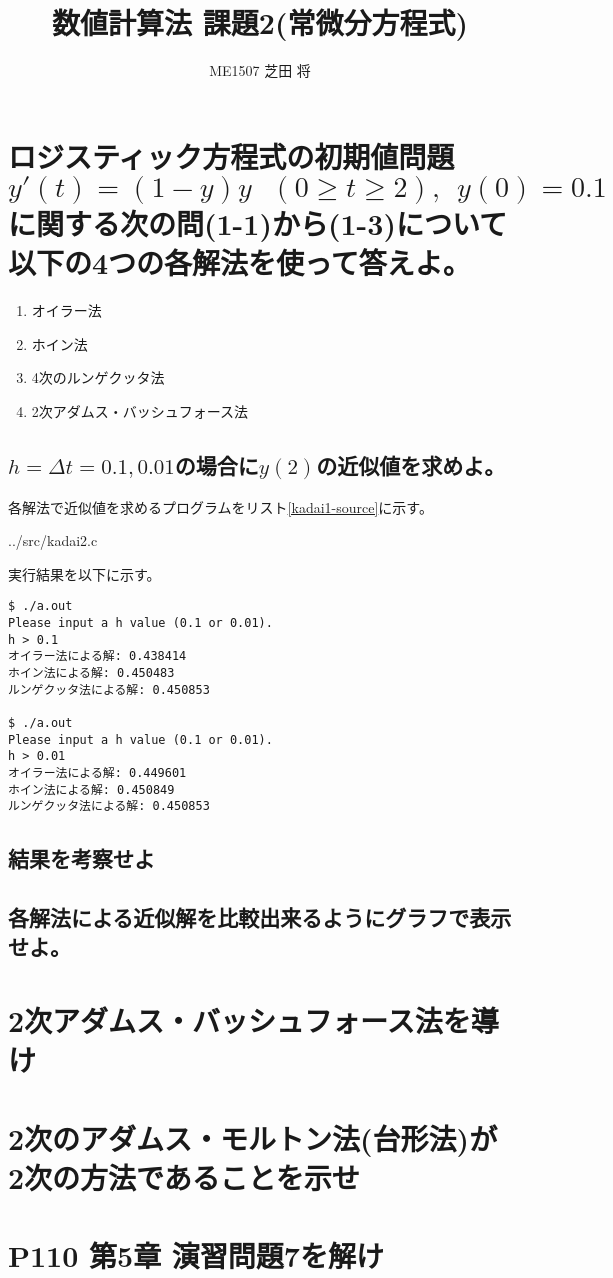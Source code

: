 \documentclass[]{jsarticle}
\title{\LARGE {数値計算法 課題2(常微分方程式)}}
\author{\large {ME1507 芝田 将}}
\begin{document}
\maketitle

\section{ロジスティック方程式の初期値問題$y'(t)=(1-y)y ~~~ (0 \ge t \ge 2),~~ y(0)=0.1$に関する次の問(1-1)から(1-3)について以下の4つの各解法を使って答えよ。}

\begin{enumerate}
\item オイラー法
\item ホイン法
\item 4次のルンゲクッタ法
\item 2次アダムス・バッシュフォース法
\end{enumerate}

\subsection{$h=\Delta t = 0.1, 0.01$の場合に$y(2)$の近似値を求めよ。}

各解法で近似値を求めるプログラムをリスト\ref{kadai1-source}に示す。


{../src/kadai2.c}


実行結果を以下に示す。

\begin{lstlisting}[caption=実行結果,label=kadai2-result]
$ ./a.out
Please input a h value (0.1 or 0.01).
h > 0.1
オイラー法による解: 0.438414
ホイン法による解: 0.450483
ルンゲクッタ法による解: 0.450853

$ ./a.out
Please input a h value (0.1 or 0.01).
h > 0.01
オイラー法による解: 0.449601
ホイン法による解: 0.450849
ルンゲクッタ法による解: 0.450853
\end{lstlisting}



\subsection{結果を考察せよ}

\subsection{各解法による近似解を比較出来るようにグラフで表示せよ。}


\section{2次アダムス・バッシュフォース法を導け}

\section{2次のアダムス・モルトン法(台形法)が2次の方法であることを示せ}

\section{P110 第5章 演習問題7を解け}
\end{document}
